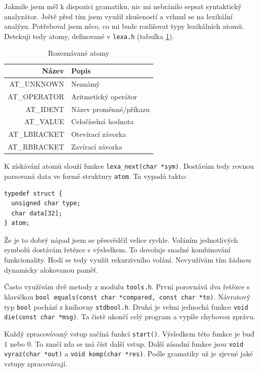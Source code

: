 \documentclass{article}
\begin{document}
Jakmile jsem měl k dispozici gramatiku, nic mi nebránilo sepsat
syntaktický analyzátor. Ještě před tím jsem využil zkušeností a vrhnul
se na lexikální analýzu.  Potřeboval jsem něco, co mi bude rozlišovat
typy lexikálních atomů. Detekuji tedy atomy, definované v
\texttt{lexa.h} (tabulka \ref{tab:atom}).

\begin{table}
\centering
\begin{tabular}{|r|l|}
\hline
Název & Popis\\ \hline\hline
AT\_UNKNOWN & Neznámý\\ \hline
AT\_OPERATOR & Aritmetický operátor\\ \hline
AT\_IDENT & Název proměnné/příkazu\\ \hline
AT\_VALUE & Celočíselná hodnota\\ \hline
AT\_LBRACKET & Otevírací závorka\\ \hline
AT\_RBRACKET & Zavírací závorka\\
\hline
\end{tabular}
\caption{Rozeznávané atomy}
\label{tab:atom}
\end{table}

K získávání atomů slouží funkce \verb+lexa_next(char *sym)+.  Dostávám
tedy rovnou parsovaná data ve formě struktury \texttt{atom}.  Ta
vypadá takto: \lstset{language=C}
\begin{lstlisting}
typedef struct {
  unsigned char type;
  char data[32];
} atom;
\end{lstlisting}

Že je to dobrý nápad jsem se přesvědčil velice rychle. Voláním
jednotlivých symbolů dostávám řetězce s výsledkem. To dovoluje
snadné kombinování funkcionality. Hodí se tedy využít rekurzivního
volání. Nevyužívám tím žádnou dynamicky alokovanou paměť.

Často využívám dvě metody z modulu \texttt{tools.h}. První porovnává
dva řetězce s hlavičkou
\verb+bool equals(const char *compared, const char *to)+. Návratový
typ \texttt{bool} pochází z knihovny \texttt{stdbool.h}. Druhá je
velmi jednochá funkce \verb+void die(const char *msg)+. Ta čistě
ukončí celý program a vypíše chybovou zprávu.

Každý zpracovávaný vstup začíná funkcí \texttt{start()}.  Výsledkem
této funkce je buď 1 nebo 0. To značí zda se má číst další vstup.
Další zásadní funkce jsou \verb+void vyraz(char *out)+ a
\verb+void komp(char *res)+. Podle gramatiky už je zjevné jaké
vstupy zpracovávají.
\end{document}
